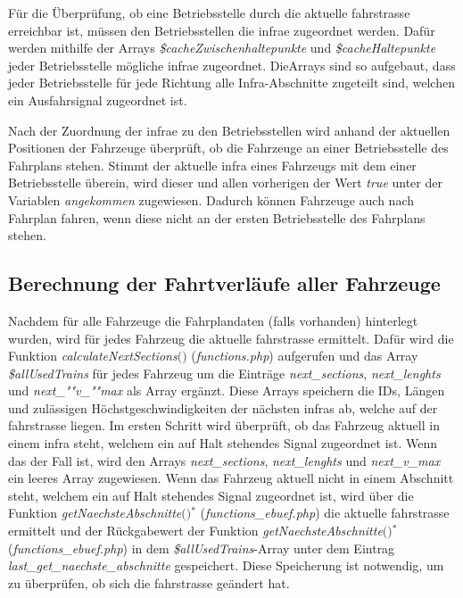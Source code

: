 Für die Überprüfung, ob eine Betriebsstelle durch die aktuelle \Gls{fahrstrasse} erreichbar ist, müssen den Betriebsstellen die \ac{infra}e zugeordnet werden. Dafür werden mithilfe der Arrays \textit{\$cache\-Zwischen\-halte\-punkte} und \textit{\$cache\-Halte\-punkte} jeder Betriebsstelle mögliche \ac{infra}e zugeordnet. Die\linebreak[4]Arrays sind so aufgebaut, dass jeder Betriebsstelle für jede Richtung alle Infra-Ab\-schnitte zugeteilt sind, welchen ein Ausfahrsignal zugeordnet ist.

Nach der Zuordnung der \ac{infra}e zu den Betriebsstellen wird anhand der aktuellen Positionen der Fahrzeuge überprüft, ob die Fahrzeuge an einer Betriebsstelle des Fahrplans stehen. Stimmt der aktuelle \ac{infra} eines Fahrzeugs mit dem einer Betriebsstelle überein, wird dieser und allen vorherigen der Wert \textit{true} unter der Variablen \textit{angekommen} zugewiesen. Dadurch können Fahrzeuge auch nach Fahrplan fahren, wenn diese nicht an der ersten Betriebsstelle des Fahrplans stehen. 
\subsection{Berechnung der Fahrtverläufe aller Fahrzeuge} \label{main_3}
Nachdem für alle Fahrzeuge die Fahrplandaten (falls vorhanden) hinterlegt wurden, wird für jedes Fahrzeug die aktuelle  \Gls{fahrstrasse} ermittelt. Dafür wird die Funktion \textit{calculateNextSections$($$)$} (\textit{functions.php}) aufgerufen und das Array \textit{\$allUsedTrains} für jedes Fahrzeug um die Einträge \textit{next\_sections}, \textit{next\_lenghts} und \textit{next\_""v\_""max} als Array ergänzt. Diese Arrays speichern die IDs, Längen und zulässigen Höchstgeschwindigkeiten der nächsten \acp{infra} ab, welche auf der \Gls{fahrstrasse} liegen. 
\newpage
Im ersten Schritt wird überprüft, ob das Fahrzeug aktuell in einem \ac{infra} steht, welchem ein auf Halt stehendes Signal zugeordnet ist. Wenn das der Fall ist, wird den Arrays \textit{next\_sections}, \textit{next\_lenghts} und \textit{next\_v\_max} ein leeres Array zugewiesen. Wenn das Fahrzeug aktuell nicht in einem Abschnitt steht, welchem ein auf Halt stehendes Signal zugeordnet ist, wird über die Funktion \textit{getNaechsteAbschnitte$($$)$}$^\ast$ (\textit{functions\_ebuef.php}) die aktuelle \Gls{fahrstrasse} ermittelt und der Rückgabewert der Funktion \textit{getNaechsteAbschnitte$($$)$}$^\ast$ (\textit{functions\_ebuef.php}) in dem \textit{\$allUsedTrains}-Array unter dem Eintrag \textit{last\_get\_naechste\_abschnitte} gespeichert. Diese Speicherung ist notwendig, um zu überprüfen, ob sich die \Gls{fahrstrasse} geändert hat. 

